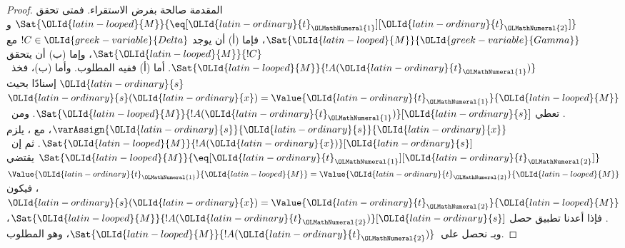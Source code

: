 \documentclass[../../../include/open-logic-section]{subfiles}
\begin{document}
\begin{proof}
المقدمة صالحة بفرض الاستقراء. فمتى تحقق
$\Sat{\OLId{latin-looped}{M}}{\eq[\OLId{latin-ordinary}{t}_\OLMathNumeral{1}][\OLId{latin-ordinary}{t}_\OLMathNumeral{2}]}$ و$\Sat{\OLId{latin-looped}{M}}{\OLId{greek-variable}{Gamma}}$، فإما (أ) أن يوجد
$!C \in \OLId{greek-variable}{Delta}$ مع $\Sat{\OLId{latin-looped}{M}}{!C}$، وإما (ب) أن يتحقق
$\Sat{\OLId{latin-looped}{M}}{!A(\OLId{latin-ordinary}{t}_\OLMathNumeral{1})}$. أما (أ) ففيه المطلوب.
وأما (ب)، فخذ~$\OLId{latin-ordinary}{s}$ إسنادًا بحيث $\OLId{latin-ordinary}{s}(\OLId{latin-ordinary}{x}) = \Value{\OLId{latin-ordinary}{t}_\OLMathNumeral{1}}{\OLId{latin-looped}{M}}$.
تعطي 
$\Sat{\OLId{latin-looped}{M}}{!A(\OLId{latin-ordinary}{t}_\OLMathNumeral{1})}[\OLId{latin-ordinary}{s}]$. ومن~$\varAssign{\OLId{latin-ordinary}{s}}{\OLId{latin-ordinary}{s}}{\OLId{latin-ordinary}{x}}$، مع
، يلزم
$\Sat{\OLId{latin-looped}{M}}{!A(\OLId{latin-ordinary}{x})}[\OLId{latin-ordinary}{s}]$.
ثم إن~$\Sat{\OLId{latin-looped}{M}}{\eq[\OLId{latin-ordinary}{t}_\OLMathNumeral{1}][\OLId{latin-ordinary}{t}_\OLMathNumeral{2}]}$ يقتضي
$\Value{\OLId{latin-ordinary}{t}_\OLMathNumeral{1}}{\OLId{latin-looped}{M}} = \Value{\OLId{latin-ordinary}{t}_\OLMathNumeral{2}}{\OLId{latin-looped}{M}}$، فيكون
$\OLId{latin-ordinary}{s}(\OLId{latin-ordinary}{x}) = \Value{\OLId{latin-ordinary}{t}_\OLMathNumeral{2}}{\OLId{latin-looped}{M}}$.
فإذا أعدنا تطبيق  حصل
$\Sat{\OLId{latin-looped}{M}}{!A(\OLId{latin-ordinary}{t}_\OLMathNumeral{2})}[\OLId{latin-ordinary}{s}]$، وبـ
 نحصل على~$\Sat{\OLId{latin-looped}{M}}{!A(\OLId{latin-ordinary}{t}_\OLMathNumeral{2})}$، وهو المطلوب.
\end{proof}
\end{document}
